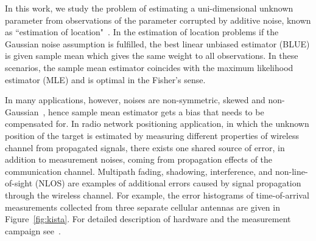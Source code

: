 \documentclass[journal]{IEEEtran}
\begin{document}
In this work, we study the problem of estimating a uni-dimensional unknown parameter from observations of the parameter corrupted by additive noise, known as ``estimation of location"~\cite{article:PI_kassam_85}. In the estimation of location problems if the Gaussian noise assumption is fulfilled, the best linear unbiased estimator (BLUE) is given sample mean which gives the same weight to all observations. In these scenarios, the sample mean estimator coincides with the maximum likelihood estimator (MLE) and is optimal in the Fisher's sense. 


In many applications, however, noises are non-symmetric, skewed and non-Gaussian~\cite{article:ITVT_kok_15,article:ITVT_chen_09,article:ISPM_gustafsson_05,article:IME_eling_12}, hence sample mean estimator gets a bias that needs to be compensated for. In radio network positioning application, in which the unknown position of the target is estimated by measuring different properties of wireless channel from propagated signals, there exists one shared source of error, in addition to measurement noises, coming from propagation effects of the communication channel. Multipath fading, shadowing, interference, and non-line-of-sight (NLOS) are examples of additional errors caused by signal propagation through the wireless channel. For example, the error histograms of time-of-arrival measurements collected from three separate cellular antennas are given in Figure~\ref{fig:kista}. For detailed description of hardware and the measurement campaign see~\cite{conf:PIMRC_medbo_09}.
\end{document}
